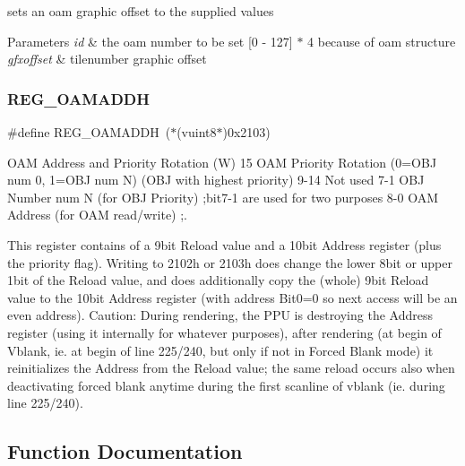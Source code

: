 sets an oam graphic offset to the supplied values 


\begin{DoxyParams}{Parameters}
{\em id} & the oam number to be set \mbox{[}0 -\/ 127\mbox{]} $\ast$ 4 because of oam structure \\
\hline
{\em gfxoffset} & tilenumber graphic offset \\
\hline
\end{DoxyParams}
\mbox{\label{a00365_ad8e30bb8ad62f2a58545ff770db95174}} 
\subsubsection{\texorpdfstring{R\+E\+G\+\_\+\+O\+A\+M\+A\+D\+DH}{REG\_OAMADDH}}
{\footnotesize\ttfamily \#define R\+E\+G\+\_\+\+O\+A\+M\+A\+D\+DH~($\ast$(vuint8$\ast$)0x2103)}



O\+AM Address and Priority Rotation (W) 15 O\+AM Priority Rotation (0=O\+BJ num 0, 1=O\+BJ num N) (O\+BJ with highest priority) 9-\/14 Not used 7-\/1 O\+BJ Number num N (for O\+BJ Priority) ;bit7-\/1 are used for two purposes 8-\/0 O\+AM Address (for O\+AM read/write) ;. 

This register contains of a 9bit Reload value and a 10bit Address register (plus the priority flag). Writing to 2102h or 2103h does change the lower 8bit or upper 1bit of the Reload value, and does additionally copy the (whole) 9bit Reload value to the 10bit Address register (with address Bit0=0 so next access will be an even address). Caution\+: During rendering, the P\+PU is destroying the Address register (using it internally for whatever purposes), after rendering (at begin of Vblank, ie. at begin of line 225/240, but only if not in Forced Blank mode) it reinitializes the Address from the Reload value; the same reload occurs also when deactivating forced blank anytime during the first scanline of vblank (ie. during line 225/240). 

\subsection{Function Documentation}
\mbox{\label{a00365_a480021d319f990d930da8fc7fb11fce4}} 
